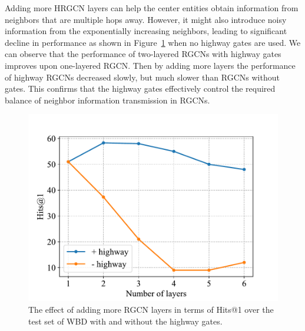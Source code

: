 	Adding more HRGCN layers can help the center entities obtain information from neighbors that are multiple hops away. However, it might also introduce noisy information from the exponentially increasing neighbors, leading to significant decline in performance as shown in Figure~\ref{highway} when no highway gates are used. We can observe that the performance of two-layered RGCNs with highway gates improves upon one-layered RGCN. Then by adding more layers the performance of highway RGCNs decreased slowly, but much slower than RGCNs without gates. This confirms that the highway gates effectively control the required balance of neighbor information transmission in RGCNs.
	\begin{figure}
		\centering
		\includegraphics[width=1\linewidth]{figures/graph3.pdf}
		\caption{The effect of adding more RGCN layers in terms of Hits@1 over the test set of WBD with and without the highway gates.}
		\label{highway}
	\end{figure}
	
